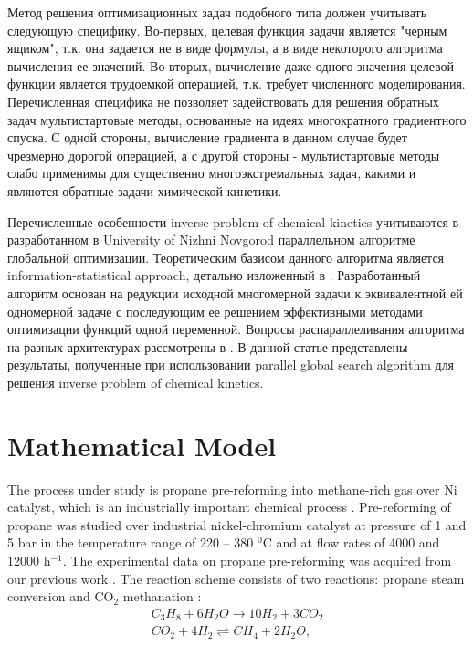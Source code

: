 \documentclass{svproc}
\begin{document}
Метод решения оптимизационных задач подобного типа должен учитывать следующую специфику. Во-первых, целевая функция задачи является "черным ящиком", т.к. она задается не в виде формулы, а в виде некоторого алгоритма вычисления ее значений. Во-вторых, вычисление даже одного значения целевой функции является трудоемкой операцией, т.к. требует численного моделирования. Перечисленная специфика не позволяет задействовать для решения обратных задач мультистартовые методы, основанные на идеях многократного градиентного спуска. С одной стороны, вычисление градиента в данном случае будет чрезмерно дорогой операцией, а с другой стороны - мультистартовые методы слабо применимы для существенно многоэкстремальных задач, какими и являются обратные задачи химической кинетики.

Перечисленные особенности inverse problem of chemical kinetics учитываются в разработанном в University of Nizhni Novgorod параллельном алгоритме глобальной оптимизации. Теоретическим базисом данного алгоритма является information-statistical approach, детально изложенный в \cite{Strongin2000}. Разработанный алгоритм основан на редукции исходной многомерной задачи к эквивалентной ей одномерной задаче с последующим ее решением эффективными методами оптимизации функций одной переменной. Вопросы распараллеливания алгоритма на разных архитектурах рассмотрены в \cite{Barkalov2016}. В данной статье представлены результаты, полученные при использовании parallel global search algorithm для решения inverse problem of chemical kinetics.


\section{Mathematical Model}\label{Sec_math_mod}

The process under study is propane pre-reforming into methane-rich gas over Ni catalyst, which is an industrially important chemical process \cite{USKOV2019126741, Uskov_en}. Pre-reforming of propane was studied over industrial nickel-chromium catalyst at pressure of 1 and 5 bar in the temperature range of 220 -- 380 $^0$C and at flow rates of 4000 and 12000 h$^{-1}$. The experimental data on propane pre-reforming was acquired from our previous work \cite{Uskov_en}.  The reaction scheme consists of two reactions: propane steam conversion and CO$_2$ methanation \cite{Uskov_cat}:
\begin{gather}
C_3H_8 + 6H_2O \rightarrow 10H_2 + 3CO_2 \label{reac_ref}\\
CO_2 + 4H_2 \rightleftharpoons CH_4 + 2H_2O \label{reac_met},
\end{gather}
\end{document}
